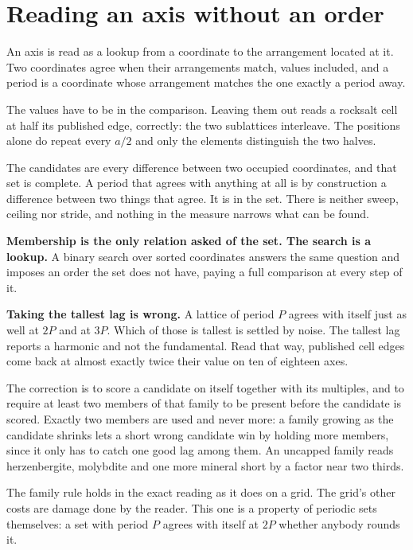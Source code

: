\section{Reading an axis without an order}

An axis is read as a lookup from a coordinate to the arrangement located at it. Two coordinates agree when their arrangements match, values included, and a period is a coordinate whose arrangement matches the one exactly a period away.

The values have to be in the comparison. Leaving them out reads a rocksalt cell at half its published edge, correctly: the two sublattices interleave. The positions alone do repeat every $a/2$ and only the elements distinguish the two halves.

The candidates are every difference between two occupied coordinates, and that set is complete. A period that agrees with anything at all is by construction a difference between two things that agree. It is in the set. There is neither sweep, ceiling nor stride, and nothing in the measure narrows what can be found.

\textbf{Membership is the only relation asked of the set. The search is a lookup.} A binary search over sorted coordinates answers the same question and imposes an order the set does not have, paying a full comparison at every step of it.

\textbf{Taking the tallest lag is wrong.} A lattice of period $P$ agrees with itself just as well at $2P$ and at $3P$. Which of those is tallest is settled by noise. The tallest lag reports a harmonic and not the fundamental. Read that way, published cell edges come back at almost exactly twice their value on ten of eighteen axes.

The correction is to score a candidate on itself together with its multiples, and to require at least two members of that family to be present before the candidate is scored. Exactly two members are used and never more: a family growing as the candidate shrinks lets a short wrong candidate win by holding more members, since it only has to catch one good lag among them. An uncapped family reads herzenbergite, molybdite and one more mineral short by a factor near two thirds.

The family rule holds in the exact reading as it does on a grid. The grid's other costs are damage done by the reader. This one is a property of periodic sets themselves: a set with period $P$ agrees with itself at $2P$ whether anybody rounds it.

